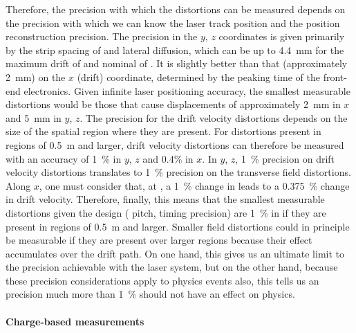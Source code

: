 Therefore, the precision with which the \efield distortions can be measured depends on the precision with which we can know the laser track position and the  position reconstruction precision.
The  precision in the $y$, $z$ coordinates is given primarily by the  strip spacing of \dpstrippitch and lateral diffusion, which can be up to \SI{4.4}{\milli\m} for the maximum drift of \dpmaxdrift and nominal \efield of \dpnominaldriftfield.
It is slightly better than that (approximately \SI{2}{\milli\m}) on the $x$ (drift) coordinate, determined by the \fepeaktime peaking time of the front-end electronics.
Given infinite laser positioning accuracy, the smallest measurable \efield distortions would be those that cause displacements of approximately \SI{2}{\milli\m} in $x$ and \SI{5}{\milli\m} in $y$, $z$. The precision for the drift velocity distortions depends on the size of the spatial region where they are present. For distortions present in regions of \SI{0.5}{\m} and larger, drift velocity distortions can therefore be measured with an accuracy of \SI{1}{\%} in $y$, $z$ and \num{0.4}\% in $x$. In $y$, $z$, \SI{1}{\%} precision on drift velocity distortions translates to \SI{1}{\%} precision on the transverse field distortions. Along $x$, one must consider that, at \dpnominaldriftfield, a \SI{1}{\%} change in \efield leads to a \SI{0.375}{\%} change in drift velocity. Therefore, finally, this means that the smallest measurable distortions given the  design ( pitch, timing precision) are \SI{1}{\%} in \efield if they are present in regions of \SI{0.5}{\m} and larger. Smaller field distortions could in principle be measurable if they are present over larger regions because their effect accumulates over the drift path.
On one hand, this gives us an ultimate limit to the \efield precision achievable with the laser system, but on the other hand, because these  precision considerations apply to physics events also, this tells us an \efield precision much more than \SI{1}{\%} should not have an effect on physics.

\paragraph{Charge-based measurements}

